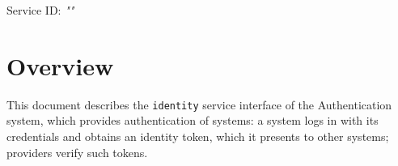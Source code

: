 \documentclass[a4paper]{arrowhead}
\begin{document}
\sloppy

\ArrowheadSetup

\begin{center}
  \vspace*{1cm}
  \huge{\arrowtitle}

  \vspace*{0.2cm}
  \LARGE{\arrowtype}
  \vspace*{1cm}

  \Large{Service ID: \textit{"\arrowid"}}

  \vspace*{\fill}


  \vspace*{1cm}
  \vspace*{\fill}

  \begin{abstract}
    This document describes the HTTP/1.1 protocol with TLS payload security and JSON payload encoding variant of the \texttt{identity} service of the Authentication system.
  \end{abstract}

  \vspace*{1cm}
\end{center}

\newpage

\tableofcontents
\newpage

\section{Overview}
\label{sec:overview}

This document describes the \texttt{identity} service interface of the Authentication system, which provides authentication of systems: a system logs in with its credentials and obtains an identity token, which it presents to other systems; providers verify such tokens.
\end{document}
